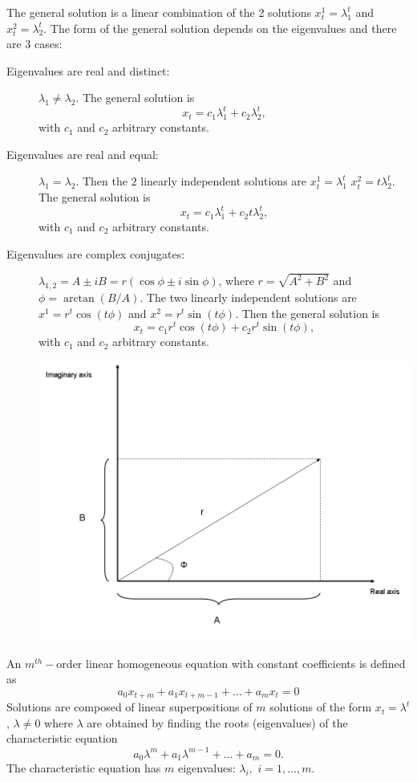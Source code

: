 The general solution is a linear combination of the 2 solutions $x_t^1=\lambda_1^t$ and $x_t^2=\lambda_2^t$. The form of the general solution depends on the eigenvalues and there are 3 cases:
\begin{description}
\item[Eigenvalues are real and distinct:] $\lambda _1 \not = \lambda _2 $. The general solution is
$$x_t=c_1\lambda _1 ^t+c_2\lambda _2 ^t,$$
with $c_1$ and $c_2$ arbitrary constants.
\item[Eigenvalues are real and equal:] $\lambda _1  = \lambda _2 $. Then the $2$ linearly independent solutions are  $x_t^1=\lambda _1^t$ $x_t^2=t\lambda _2^t$. 
The general solution is
$$x_t=c_1\lambda _1 ^t+c_2t\lambda _2 ^t,$$
with $c_1$ and $c_2$ arbitrary constants.
\item[Eigenvalues are complex conjugates:] $\lambda _{1,2}=A\pm iB=r(\cos \phi \pm i \sin \phi)$, where $r=\sqrt{A^2+B^2}$ and $\phi=\arctan(B/A)$. The two linearly independent solutions are $x^1=r^t\cos(t\phi)$ and $x^2=r^t\sin (t\phi)$.
Then the general solution is
$$x_t=c_1 r^t\cos(t\phi)+c_2r^t\sin (t\phi),$$
with $c_1$ and $c_2$ arbitrary constants.
\begin{center}
\includegraphics[width=.5\textwidth]{figs_steph/FigurePhase}
\end{center}
\end{description}


An $m^{th}-$order linear homogeneous equation with constant coefficients is defined as
\begin{equation}\label{eq:LinH}
a_0x_{t+m}+a_1x_{t+m-1}+\dots + a_m x_{t}=0
\end{equation}
Solutions are composed of linear superpositions of $m$ solutions of the form 
$x_t=\lambda ^t$, $\lambda \not = 0$
where $\lambda$ are obtained by finding the roots (eigenvalues) of the characteristic equation
$$a_0\lambda^{m}+a_1\lambda^{m-1}+\dots + a_m =0.$$
The characteristic equation has $m$ eigenvalues: $\lambda _i,$ $i=1,\dots, m$. 

